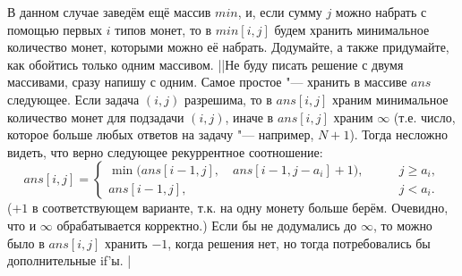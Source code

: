 В данном случае заведём ещё массив $min$, и, если сумму $j$ можно набрать с помощью первых $i$ типов монет, то в $min[i,j]$ будем хранить минимальное количество монет, которыми можно её набрать. Додумайте, а также придумайте, как обойтись только одним массивом.
||Не буду писать решение с двумя массивами, сразу напишу с одним. Самое простое "--- хранить в массиве $ans$ следующее. Если задача $(i,j)$ разрешима, то в $ans[i,j]$ храним минимальное количество монет для подзадачи $(i,j)$, иначе в $ans[i,j]$ храним $\infty$ (т.е. число, которое больше любых ответов на задачу "--- например, $N+1$). Тогда несложно видеть, что верно следующее рекуррентное соотношение:
$$
ans[i,j]=\left\{
\begin{array}{ll}
\min\big(ans[i-1,j],\quad ans[i-1,j-a_i]+1\big),&\qquad j\geq a_i,\\
ans[i-1,j],&\qquad j<a_i.
\end{array}\right.
$$
($+1$ в соответствующем варианте, т.к. на одну монету больше берём. Очевидно, что и $\infty$ обрабатывается корректно.) 
Если бы не додумались до $\infty$, то можно было в $ans[i,j]$ хранить $-1$, когда решения нет, но тогда потребовались бы дополнительные if'ы.
|\label{min_coins}

